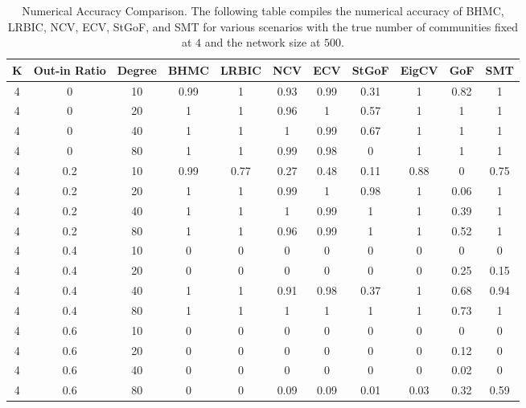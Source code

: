 \documentclass[11pt]{article}
\begin{document}
\begin{table}[H]
\caption{Numerical Accuracy Comparison. The following table compiles the numerical accuracy of BHMC, LRBIC, NCV, ECV, StGoF, and SMT for various scenarios with the true number of communities fixed at $4$ and the network size at $500$.}\label{T5}
\centering
\begin{tabular}{|c| c | c | c| c | c | c | c | c| c| c|}
\hline
K & Out-in Ratio & Degree & BHMC & LRBIC & NCV & ECV & StGoF & EigCV & GoF & SMT 
\\
\hline
4 & 0 & 10 & 0.99 & 1 & 0.93 & 0.99 & 0.31 & 1 & 0.82 & 1 \\
4 & 0 & 20 & 1 & 1 & 0.96 & 1 & 0.57 & 1 & 1 & 1\\
4 & 0 & 40 & 1 & 1 & 1 & 0.99 & 0.67 & 1 & 1 & 1 \\
4 & 0 & 80 & 1 & 1 & 0.99 & 0.98 & 0 & 1 & 1 & 1 \\
\hline
4 & 0.2 & 10 & 0.99 & 0.77 & 0.27 & 0.48 & 0.11 & 0.88 & 0 & 0.75 \\
4 & 0.2 & 20 & 1 & 1 & 0.99 & 1 & 0.98 & 1 & 0.06 & 1\\
4 & 0.2 & 40 & 1 & 1 & 1 & 0.99 & 1 & 1 & 0.39 & 1 \\
4 & 0.2 & 80 & 1 & 1 & 0.96 & 0.99 & 1 & 1 & 0.52 & 1 \\
\hline
4 & 0.4 & 10 & 0 & 0 & 0 & 0 & 0 & 0 & 0 & 0 \\
4 & 0.4 & 20 & 0 & 0 & 0 & 0 & 0 & 0 & 0.25 & 0.15\\
4 & 0.4 & 40 & 1 & 1 & 0.91 & 0.98 & 0.37 & 1 & 0.68 & 0.94 \\
4 & 0.4 & 80 & 1 & 1 & 1 & 1 & 1 & 1 & 0.73 & 1 \\
\hline
4 & 0.6 & 10 & 0 & 0 & 0 & 0 & 0 & 0 & 0 & 0 \\
4 & 0.6 & 20 & 0 & 0 & 0 & 0 & 0 & 0 & 0.12 & 0\\
4 & 0.6 & 40 & 0 & 0 & 0 & 0 & 0 & 0 & 0.02 & 0 \\
4 & 0.6 & 80 & 0 & 0 & 0.09 & 0.09 & 0.01 & 0.03 & 0.32 & 0.59 \\
\hline
\end{tabular}
\end{table}
\end{document}
